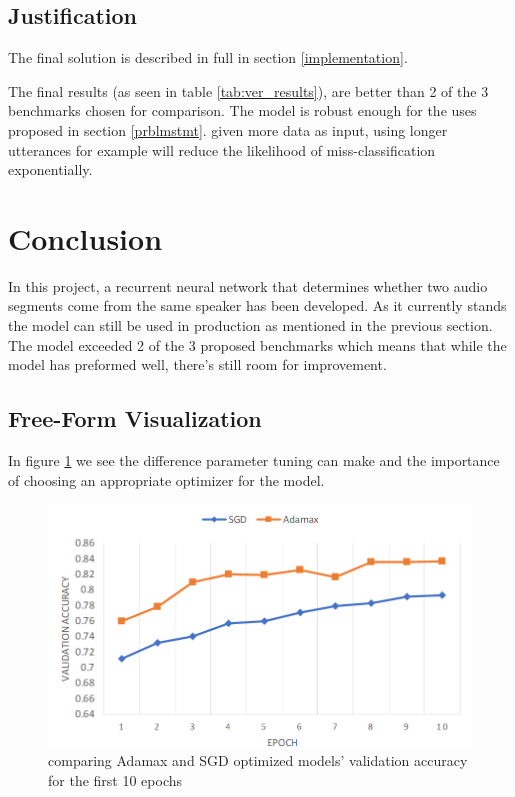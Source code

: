 \documentclass{article}
\begin{document}
\subsection{Justification}

The final solution is described in full in section \ref{implementation}.

The final results (as seen in table \ref{tab:ver_results}), are better than 2 of the 3 benchmarks chosen for comparison. The model is robust enough for the uses proposed in section \ref{prblmstmt}.
given more data as input, using longer utterances for example will reduce the likelihood of miss-classification exponentially.
\section{Conclusion}
In this project, a recurrent neural network that determines whether two audio segments come from the same speaker has been developed.  As it currently stands the model can still be used in production as mentioned in the previous section. The model exceeded 2 of the 3 proposed benchmarks which means that while the model has preformed well, there's still room for improvement.
\subsection{Free-Form Visualization}
In figure \ref{fig:optimizers} we see the difference parameter tuning can make and the importance of choosing an appropriate optimizer for the model.
\begin{figure}[H]
    \centering
    \includegraphics[scale=.5]{images/adamax_vs_sgd.png}
    \caption{comparing Adamax and SGD optimized models' validation accuracy for the first 10 epochs}
    \label{fig:optimizers}
\end{figure}
\end{document}
